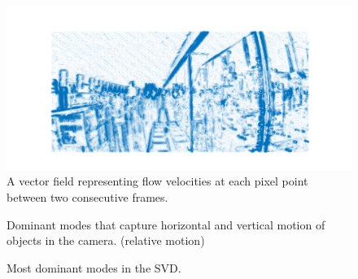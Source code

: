 \documentclass{article}
\begin{document}
\begin{figure}[!b]
\centering
\includegraphics[width=\linewidth]{./Figures/velocity.png}
\caption{A vector field representing flow velocities at each pixel point between two consecutive frames.}
\label{fig:vel}
\end{figure}

\begin{figure}[!t]
\centering
{}
\caption{Dominant modes that capture horizontal and vertical motion of objects in the camera. (relative motion)}
\label{fig:mode}
\end{figure}

\begin{figure}[!t]
\centering
{}
\caption{Most dominant modes in the SVD.}
\label{fig:mode2}
\end{figure}
\end{document}
